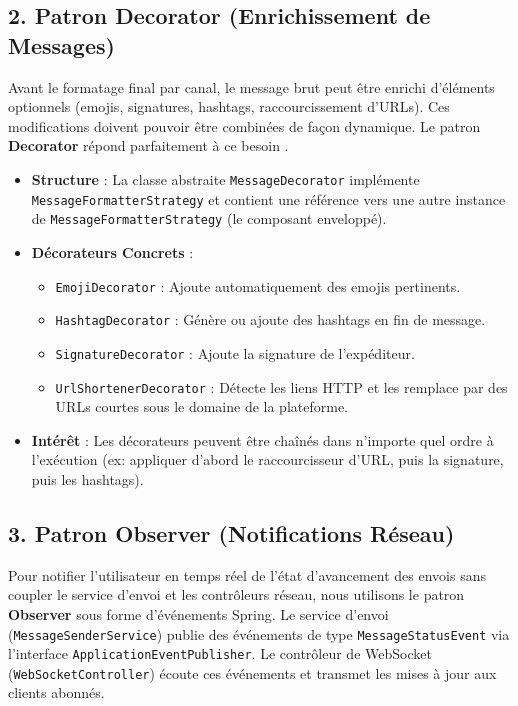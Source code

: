 \subsection{2. Patron Decorator (Enrichissement de Messages)}
Avant le formatage final par canal, le message brut peut être enrichi d'éléments optionnels (emojis, signatures, hashtags, raccourcissement d'URLs). Ces modifications doivent pouvoir être combinées de façon dynamique. Le patron \textbf{Decorator} répond parfaitement à ce besoin \cite{designpatterns}.
\begin{itemize}
    \item \textbf{Structure} : La classe abstraite \texttt{MessageDecorator} implémente \texttt{MessageFormatterStrategy} et contient une référence vers une autre instance de \texttt{MessageFormatterStrategy} (le composant enveloppé).
    \item \textbf{Décorateurs Concrets} :
    \begin{itemize}
        \item \texttt{EmojiDecorator} : Ajoute automatiquement des emojis pertinents.
        \item \texttt{HashtagDecorator} : Génère ou ajoute des hashtags en fin de message.
        \item \texttt{SignatureDecorator} : Ajoute la signature de l'expéditeur.
        \item \texttt{UrlShortenerDecorator} : Détecte les liens HTTP et les remplace par des URLs courtes sous le domaine de la plateforme.
    \end{itemize}
    \item \textbf{Intérêt} : Les décorateurs peuvent être chaînés dans n'importe quel ordre à l'exécution (ex: appliquer d'abord le raccourcisseur d'URL, puis la signature, puis les hashtags).
\end{itemize}

\subsection{3. Patron Observer (Notifications Réseau)}
Pour notifier l'utilisateur en temps réel de l'état d'avancement des envois sans coupler le service d'envoi et les contrôleurs réseau, nous utilisons le patron \textbf{Observer} sous forme d'événements Spring.
Le service d'envoi (\texttt{MessageSenderService}) publie des événements de type \texttt{MessageStatusEvent} via l'interface \texttt{ApplicationEventPublisher}. Le contrôleur de WebSocket (\texttt{WebSocketController}) écoute ces événements et transmet les mises à jour aux clients abonnés.

